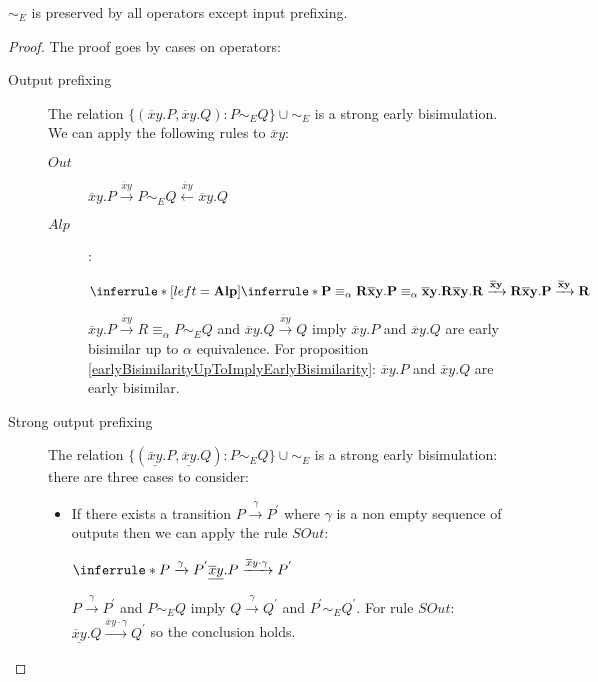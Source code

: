 \begin{lemma}\label{earlyBisimulationProprerties}
  $\sim_{E}$ is preserved by all operators except input prefixing.
  \begin{proof}
    The proof goes by cases on operators:
    \begin{description}
      \item[Output prefixing]
	The relation $\{(\overline{x}y.P, \overline{x}y.Q): P\sim_{E} Q\} \cup \sim_{E}$ is a strong early bisimulation. We can apply the following rules to $\overline{x}y$:
	\begin{description}
	  \item[$Out$]
	    $\overline{x}y.P \xrightarrow{\overline{x}y} P \sim_{E} Q \stackrel{\overline{x}y}{\longleftarrow} \overline{x}y.Q$
	  \item[$Alp$]:
	    \begin{center}
	      $\inferrule* [left=\bf{Alp}]{
		  \inferrule* {
		    P \equiv_{\alpha} R
		  }{
		    \overline{x}y.P \equiv_{\alpha} \overline{x}y.R
		  }
		\\
		  \overline{x}y.R \xrightarrow{\overline{x}y} R
	      }{
		  \overline{x}y.P \xrightarrow{\overline{x}y} R
	      }$
	    \end{center}
	    $\overline{x}y.P \xrightarrow{\overline{x}y} R \equiv_{\alpha} P \sim_{E} Q$ and $\overline{x}y.Q \xrightarrow{\overline{x}y} Q$ imply $\overline{x}y.P$ and $\overline{x}y.Q$ are early bisimilar up to $\alpha$ equivalence. For proposition \ref{earlyBisimilarityUpToImplyEarlyBisimilarity}: $\overline{x}y.P$ and $\overline{x}y.Q$ are early bisimilar.
	\end{description}
      \item[Strong output prefixing]
	The relation $\{(\underline{\overline{x}y}.P, \underline{\overline{x}y}.Q): P\sim_{E} Q\} \cup \sim_{E}$ is a strong early bisimulation: there are three cases to consider:
	\begin{itemize}
	  \item 
	    If there exists a transition $P \xrightarrow{\gamma} P^{'}$ where $\gamma$ is a non empty sequence of outputs then we can apply the rule $SOut$:
	    \begin{center}
	      $\inferrule* {
		P \xrightarrow{\gamma} P^{'}
	      }{
		\underline{\overline{x}y}.P \xrightarrow{\overline{x}y \cdot \gamma} P^{'}
	      }$
	    \end{center}
	    $P \xrightarrow{\gamma} P^{'}$ and $P \sim_{E} Q$ imply $Q \xrightarrow{\gamma} Q^{'}$ and $P^{'} \sim_{E} Q^{'}$. For rule $SOut$: $\underline{\overline{x}y}.Q \xrightarrow{\overline{x}y \cdot \gamma} Q^{'}$ so the conclusion holds.

\end{itemize}
\end{description}
\end{proof}
\end{lemma}
